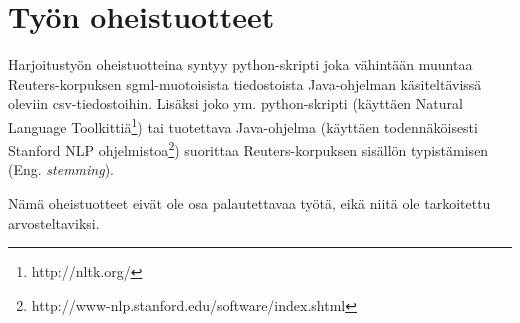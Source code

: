 \documentclass[12pt,a4paper]{article}
\begin{document}
\section{Työn oheistuotteet}
Harjoitustyön oheistuotteina syntyy python-skripti joka vähintään muuntaa Reuters-korpuksen sgml-muotoisista tiedostoista Java-ohjelman käsiteltävissä oleviin csv-tiedostoihin. Lisäksi joko ym. python-skripti (käyttäen Natural Language Toolkittiä\footnote{http://nltk.org/}) tai tuotettava Java-ohjelma (käyttäen todennäköisesti Stanford NLP ohjelmistoa\footnote{http://www-nlp.stanford.edu/software/index.shtml}) suorittaa Reuters-korpuksen sisällön typistämisen (Eng. \textit{stemming}).

Nämä oheistuotteet eivät ole osa palautettavaa työtä, eikä niitä ole tarkoitettu arvosteltaviksi.
\end{document}
